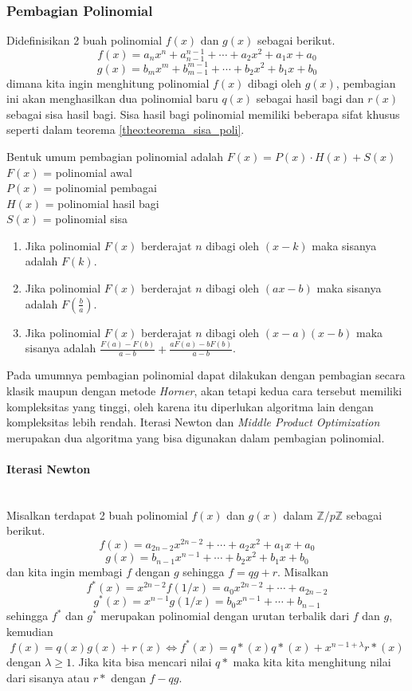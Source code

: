 \subsubsection{ Pembagian Polinomial}
Didefinisikan 2 buah polinomial $f(x)$ dan $g(x)$ sebagai berikut.
$$ f(x) = a_n x^n + a_{n-1}^{n-1} + \cdots + a_2x^2 + a_1x + a_0 $$
$$ g(x) = b_m x^m + b_{m-1}^{m-1} + \cdots + b_2x^2 + b_1x + b_0 $$
dimana kita ingin menghitung polinomial $ f(x) $ dibagi oleh $ g(x) $, pembagian ini akan menghasilkan dua polinomial baru $ q(x) $ sebagai hasil bagi dan $ r(x) $ sebagai sisa hasil bagi. Sisa hasil bagi polinomial memiliki beberapa sifat khusus seperti dalam teorema \ref{theo:teorema_sisa_poli}.
\begin{theo}
	\label{theo:teorema_sisa_poli}
	Bentuk umum pembagian polinomial adalah $ F(x) = P(x) \cdot H(x) + S(x) $ \\
	$ F(x) $ = polinomial awal \\
	$ P(x) $ = polinomial pembagai \\
	$ H(x) $ = polinomial hasil bagi \\
	$ S(x) $ = polinomial sisa \\
	\begin{enumerate}
		\item Jika polinomial $ F(x) $ berderajat $ n $ dibagi oleh $ (x - k) $ maka sisanya adalah $ F(k) $.
		\item Jika polinomial $ F(x) $ berderajat $ n $ dibagi oleh $ (ax - b) $ maka sisanya adalah $ F(\frac{b}{a}) $.
		\item Jika polinomial $ F(x) $ berderajat $ n $ dibagi oleh $ (x - a)(x - b) $ maka sisanya adalah $ \frac{F(a) - F(b)}{a - b} +  \frac{aF(a) - bF(b)}{a - b}$.
	\end{enumerate}
\end{theo}
Pada umumnya pembagian polinomial dapat dilakukan dengan pembagian secara klasik maupun dengan metode \textit{Horner}, akan tetapi kedua cara tersebut memiliki kompleksitas yang tinggi, oleh karena itu diperlukan algoritma lain dengan kompleksitas lebih rendah. Iterasi Newton dan \textit{Middle Product Optimization} merupakan dua algoritma yang bisa digunakan dalam pembagian polinomial.

\paragraph{Iterasi Newton}\mbox{}\\
\indent Misalkan terdapat 2 buah polinomial $f(x)$ dan $g(x)$ dalam $ \mathbb{Z}/p\mathbb{Z} $ sebagai berikut.
$$ f(x) = a_{2n-2} x^{2n-2} + \cdots + a_2x^2 + a_1x + a_0 $$
$$ g(x) = b_{n-1} x^{n-1} + \cdots + b_2x^2 + b_1x + b_0 $$
dan kita ingin membagi $ f $ dengan $ g $ sehingga $ f = qg + r $.
Misalkan 
$$ f^*(x) = x^{2n-2}f(1/x) = a_0 x^{2n-2} + \cdots + a_{2n-2} $$
$$ g^*(x) = x^{n-1}g(1/x) = b_0 x^{n-1} + \cdots + b_{n-1} $$
sehingga $ f^* $ dan $ g^* $ merupakan polinomial dengan urutan terbalik dari $ f $ dan $ g $, kemudian
$$  f(x) = q(x)g(x) + r(x) \iff f^*(x) = q*(x) q*(x) + x^{n-1+\lambda} r*(x) $$
dengan $ \lambda \geq 1 $. Jika kita bisa mencari nilai $ q* $ maka kita kita menghitung nilai dari sisanya atau $ r* $ dengan $ f-qg $.

